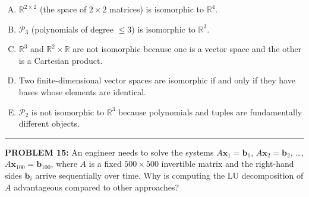 \documentclass[12pt]{amsart}
\newcommand{\divider}{
  \vspace{-1em} %
  \noindent
  \raisebox{-0.15ex}{\textbullet}%
  \hspace{0.5em}%
  \rule[0.5ex]{0.95\textwidth}{1.0pt}%
  \hspace{0.5em}%
  \raisebox{-0.15ex}{\textbullet}%
  \vspace{0em} %
}
\begin{document}
\begin{enumerate}[(A)]
\item $\mathbb{R}^{2 \times 2}$ (the space of $2 \times 2$ matrices) is isomorphic to $\mathbb{R}^4$.
\item $\mathcal{P}_3$ (polynomials of degree $\leq 3$) is isomorphic to $\mathbb{R}^3$.
\item $\mathbb{R}^3$ and $\mathbb{R}^2 \times \mathbb{R}$ are not isomorphic because one is a vector space and the other is a Cartesian product.
\item Two finite-dimensional vector spaces are isomorphic if and only if they have bases whose elements are identical.
\item $\mathcal{P}_2$ is not isomorphic to $\mathbb{R}^3$ because polynomials and tuples are fundamentally different objects.
\end{enumerate}


\divider

{\bf PROBLEM 15:}
An engineer needs to solve the systems $A\mathbf{x}_1 = \mathbf{b}_1$, $A\mathbf{x}_2 = \mathbf{b}_2$, \ldots, $A\mathbf{x}_{100} = \mathbf{b}_{100}$, where $A$ is a fixed $500 \times 500$ invertible matrix and the right-hand sides $\mathbf{b}_i$ arrive sequentially over time. Why is computing the LU decomposition of $A$ advantageous compared to other approaches?
\end{document}
